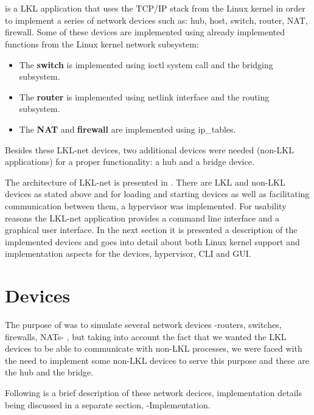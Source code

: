 \section{\project}
\label{sec:lkl-net}
\textbf{\project} is a LKL application that uses the  TCP/IP stack from the Linux kernel in order to implement a series of network devices such as: hub, host, switch, router, NAT, firewall. Some of these devices are implemented using already implemented functions from the Linux kernel network subsystem: 
\begin{itemize}
\item The \textbf{switch} is implemented using ioctl system call and the bridging subsystem. 
\item The \textbf{router} is implemented using netlink interface and the routing subsystem.
\item The \textbf{NAT} and \textbf{firewall} are implemented using ip_tables. 
\end{itemize} 
Besides these LKL-net devices, two additional devices were needed (non-LKL applications) for a proper functionality: a hub and a bridge device.

The architecture of LKL-net is presented in .
There are LKL and non-LKL devices as stated above and for loading and starting devices as well as facilitating communication between them, a hypervisor was implemented. For usability reasons the LKL-net application provides a command line interface and a graphical user interface.
In the next section it is presented a description of the implemented devices and  goes into detail about both Linux kernel support and implementation aspects for the devices, hypervisor, CLI and GUI. 
\section{Devices}
\label{sec:devices}
The purpose of \project was to simulate several network devices -routers, switches, firewalls, NATs- , but taking into account the fact that we wanted the LKL devices to be able to communicate with non-LKL processes, we were faced with the need to implement some non-LKL devices to serve this purpose and these are the hub and the bridge.

Following is a brief description of these network decices, implementation details being discussed in a separate section,  -Implementation.

